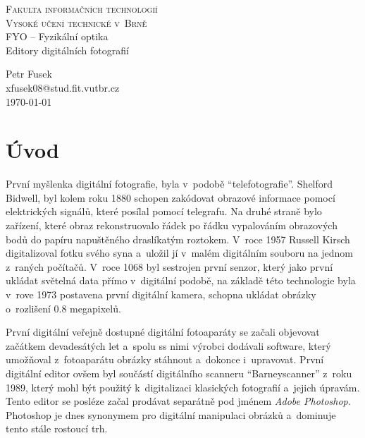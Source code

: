 \documentclass[11pt, a4paper, titlepage]{article}
\renewcommand{\uv}[1]{``#1''}
\begin{document}
\begin{titlepage}
    \begin{center}
        \textsc{\LARGE Fakulta informačních technologií}\\
        \vspace{0.1 cm}
        \textsc{\LARGE Vysoké učení technické v~Brně}\\
        {\Huge FYO -- Fyzikální optika}\\
        {\huge Editory digitálních fotografií}
    \end{center}
    \begin{center}
    \Large
    Petr Fusek \\
    xfusek08@stud.fit.vutbr.cz \\
    \today
    \end{center}
\end{titlepage}


\section{Úvod}
První myšlenka digitální fotografie, byla v~podobě \uv{telefotografie}.
Shelford Bidwell, byl kolem roku 1880 schopen zakódovat obrazové informace pomocí elektrických signálů, které posílal pomocí telegrafu.
Na druhé straně bylo zařízení, které obraz rekonstruovalo řádek po řádku vypalováním obrazových bodů do papíru napuštěného draslíkatým roztokem.
V~roce 1957 Russell Kirsch digitalizoval fotku svého syna a~uložil jí v~malém digitálním souboru na jednom z~raných počítačů.
V~roce 1068 byl sestrojen první senzor, který jako první ukládat světelná data přímo v~digitální podobě, na základě této technologie byla v~rove 1973 postavena první digitální kamera, schopna ukládat obrázky o~rozlišení 0.8 megapixelů.
\cite{first_digital_photography}
 
První digitální veřejně dostupné digitální fotoaparáty se začali objevovat začátkem devadesátých let a~spolu ss nimi výrobci dodávali software, který umožňoval z~fotoaparátu obrázky stáhnout a~dokonce i~upravovat.
První digitální editor ovšem byl součástí digitálního scanneru \uv{Barneyscanner} z~roku 1989, který mohl být použitý k~digitalizaci klasických fotografií a~jejich úpravám.
Tento editor se posléze začal prodávat separátně pod jménem \emph{Adobe Photoshop}.
Photoshop je dnes synonymem pro digitální manipulaci obrázků a~dominuje tento stále rostoucí trh. \cite{digital_editing_histroy}
\end{document}
